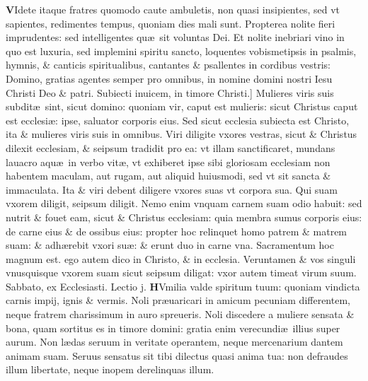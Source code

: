 \documentclass[a5paper,10pt]{book}
\def\leftmarginnote{%
	\lrmarginnote{\hskip -\marginparsep \hskip -6.5em}}
\def\rightmarginnote{%
	\lrmarginnote{\hskip\columnwidth \hskip -1em}}
\def\ae{æ}
\begin{document}
\begin{multicols*}{2}
\lettrine[lines=2]{\bfseries \color{red} V}{}\textdagger Idete\leftmarginnote{\begin{flushright}c.5.c\end{flushright}} itaque fratres quomodo caute ambuletis, non quasi insipientes, sed vt sapientes, redimentes tempus, quoniam dies mali sunt.
Propterea nolite fieri imprudentes: sed intelligentes qu\ae \ sit voluntas Dei. Et nolite inebriari vino in quo est luxuria, sed implemini spiritu sancto, loquentes vobismetipsis in psalmis, hymnis, \& canticis spiritualibus, cantantes \& psallentes in cordibus vestris: Domino, gratias agentes semper pro omnibus, in nomine domini nostri Iesu Christi Deo \& patri.
Subiecti inuicem, in timore\leftmarginnote{\begin{flushright}D\end{flushright}} Christi.] Mulieres viris suis subdit\ae \ sint, sicut domino: quoniam vir, caput est mulieris: sicut Christus caput est ecclesi\ae : ipse, saluator corporis eius.
Sed sicut ecclesia subiecta est Christo, ita \& mulieres viris suis in omnibus.
Viri diligite vxores vestras, sicut \& Christus dilexit ecclesiam, \& seipsum tradidit pro ea: vt illam sanctificaret, mundans lauacro aqu\ae \ in verbo vit\ae , vt exhiberet ipse sibi gloriosam ecclesiam non habentem maculam, aut rugam, aut aliquid huiusmodi, sed vt sit sancta \& immaculata.
Ita \& viri debent diligere vxores suas vt corpora sua. Qui suam vxorem diligit, seipsum diligit. Nemo enim vnquam carnem suam odio habuit: sed nutrit \& fouet eam, sicut \& Christus ecclesiam: quia membra sumus corporis eius: de carne eius \& de ossibus eius: propter hoc relinquet homo patrem \& matrem suam: \& adh\ae rebit vxori su\ae : \& erunt duo in carne vna.
Sacramentum hoc magnum est. ego autem dico in Christo, \& in ecclesia. Veruntamen \& vos singuli vnusquisque vxorem suam sicut seipsum diligat: vxor autem timeat virum suum.
\newline {} \color{red} \hypertarget{SAT-SECVNDA-VAGAN}{Sabbato,} ex Ecclesiasti. Lectio j. \color{black}
\vspace{-1.25em}
\lettrine[lines=2]{\bfseries H}{}Vmilia\rightmarginnote{ca. 7.} valde spiritum tuum: quoniam vindicta carnis impij, ignis \& vermis.
Noli pr\ae uaricari in amicum pecuniam differentem, neque fratrem charissimum in auro spreueris.
Noli discedere a muliere sensata \& bona, quam sortitus es in timore domini: gratia enim verecundi\ae \ illius super aurum.
Non l\ae das seruum in veritate operantem, neque mercenarium dantem animam suam. Seruus sensatus sit tibi dilectus quasi anima tua: non defraudes illum libertate, neque inopem derelinquas illum.

\end{multicols*}
\end{document}

